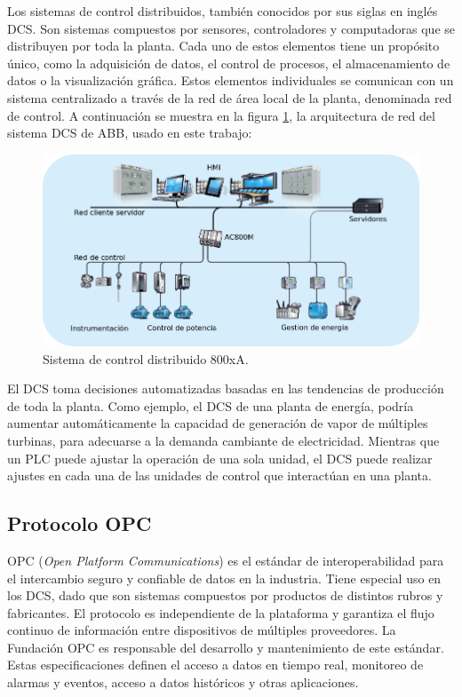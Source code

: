 Los sistemas de control distribuidos, también conocidos por sus siglas en inglés DCS. Son sistemas compuestos por sensores, controladores y computadoras que se distribuyen por toda la planta. Cada uno de estos elementos tiene un propósito único, como la adquisición de datos, el control de procesos, el almacenamiento de datos o la visualización gráfica. Estos elementos individuales se comunican con un sistema centralizado a través de la red de área local de la planta, denominada red de control. A continuación se muestra en la figura \ref{fig:800xA}, la arquitectura de red del sistema DCS de ABB, usado en este trabajo:

\begin{figure}[htpb]
	\centering
	\includegraphics[scale=.45]{./Figures/800xA.png}
	\caption{Sistema de control distribuido 800xA\protect\footnotemark.}
	\label{fig:800xA}
\end{figure}


El DCS toma decisiones automatizadas basadas en las tendencias de producción de toda la planta. Como ejemplo, el DCS de una planta de energía, podría aumentar automáticamente la capacidad de generación de vapor de múltiples turbinas, para adecuarse a la demanda cambiante de electricidad. Mientras que un PLC puede ajustar la operación de una sola unidad, el DCS puede realizar ajustes en cada una de las unidades de control que interactúan en una planta.

\subsection{Protocolo OPC}

OPC (\textit{Open Platform Communications}) es el estándar de interoperabilidad para el intercambio seguro y confiable de datos en la industria. Tiene especial uso en los DCS, dado que son sistemas compuestos por productos de distintos rubros y fabricantes. El protocolo es independiente de la plataforma y garantiza el flujo continuo de información entre dispositivos de múltiples proveedores. La Fundación OPC es responsable del desarrollo y mantenimiento de este estándar. Estas especificaciones definen el acceso a datos en tiempo real, monitoreo de alarmas y eventos, acceso a datos históricos y otras aplicaciones. 

